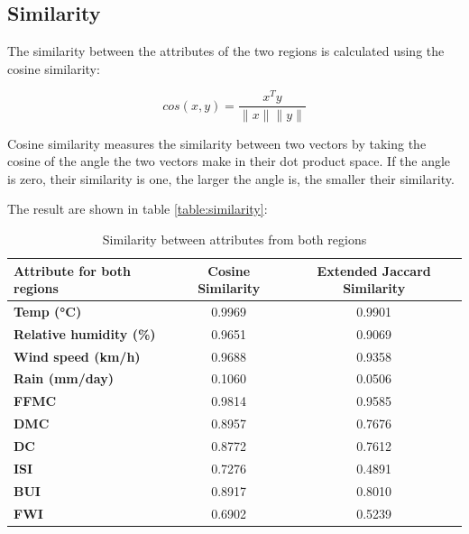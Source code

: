 \documentclass[10pt]{article}
\numberwithin{equation}{section}
\numberwithin{figure}{section}
\numberwithin{table}{section}
\begin{document}
\subsection{Similarity}

\indent The similarity between the attributes of the two regions is calculated using the cosine similarity: 

\begin{equation}
    cos(x,y) =  \frac{x^{T}y}{\|x\|\|y\|}
\end{equation}

\noindent Cosine similarity measures the similarity between two vectors by taking the
cosine of the angle the two vectors make in their dot product space. If the angle is
zero, their similarity is one, the larger the angle is, the smaller their similarity.

The result are shown in table \autoref{table:similarity}:


\begin{table}[H]
\centering
\begin{tabular}{|l|c|c|}
\hline
\textbf{Attribute for both regions}              & \textbf{Cosine Similarity} & \textbf{Extended Jaccard Similarity} \\ \hline
\textbf{Temp (°C)}              & 0.9969      &         0.9901                     \\ \hline
\textbf{Relative humidity (\%)} & 0.9651      &         0.9069                  \\ \hline
\textbf{Wind speed (km/h)}      & 0.9688      &          0.9358                   \\ \hline
\textbf{Rain (mm/day)}          & 0.1060      &            0.0506                \\ \hline
\textbf{FFMC}                   & 0.9814      &           0.9585                 \\ \hline
\textbf{DMC}                    & 0.8957      &             0.7676                 \\ \hline
\textbf{DC}                     & 0.8772      &            0.7612                  \\ \hline
\textbf{ISI}                    & 0.7276      &            0.4891                   \\ \hline
\textbf{BUI}                    & 0.8917      &             0.8010                  \\ \hline
\textbf{FWI}                    & 0.6902      &             0.5239                 \\ \hline
\end{tabular}
\caption{Similarity between attributes from both regions}
\label{table:similarity}
\end{table}
\end{document}
